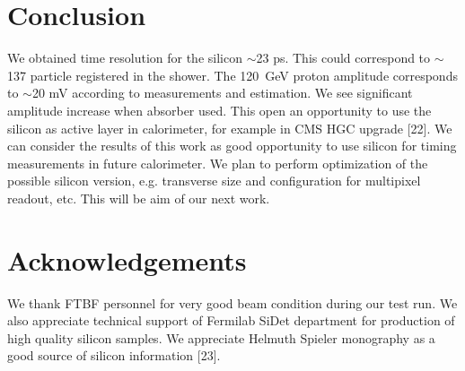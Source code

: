 \documentclass[12pt]{article}
\begin{document}
\section{Conclusion}
\label{sec:conclusion} 

We obtained time resolution for the silicon $\sim$23 ps. This could correspond to
$\sim$137 particle registered in the shower. The 120~GeV proton amplitude corresponds
to $\sim$20 mV according to measurements and estimation. We see significant amplitude
increase when absorber used. This open an opportunity to use the silicon as
active layer in calorimeter, for example in CMS HGC upgrade [22]. We can
consider the results of this work as good opportunity to use silicon for timing
measurements in future calorimeter. We plan to perform optimization of the
possible silicon version, e.g. transverse size and configuration for multipixel
readout, etc. This will be aim of our next work.


\section{Acknowledgements} We thank FTBF personnel for very good beam condition during our test run. We also appreciate technical support of Fermilab SiDet department for production of high quality silicon samples. We appreciate Helmuth Spieler monography as a good source of silicon information [23].

{}
 
\end{document}
